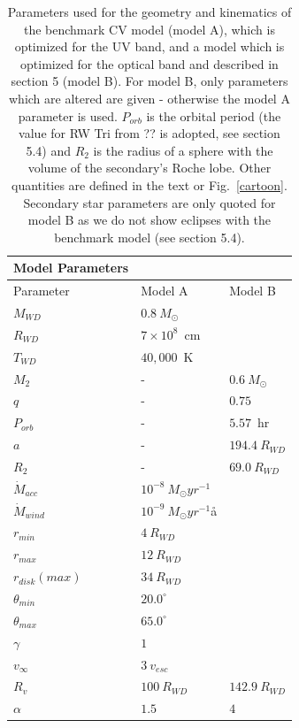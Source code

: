 \documentclass[preprint, a4paper, 11pt]{aastex}
\begin{document}
\begin{table}
\centering
\begin{tabular}{p{2cm}p{2cm}p{2cm}}
Model Parameters \\
\hline Parameter 	&	 Model A  & Model B \\ 
\hline \hline 
$M_{WD}$ 	 &	 $0.8~M_{\odot}$  &     \\ 
$R_{WD}$ 	 &	 $7\times10^{8}$~cm  & \\ 
$T_{WD}$ 	 &	 $40,000$~K        &  \\
$M_{2}$ 	& -&	 $0.6~M_{\odot}$   \\ 
$q$ 	&- &	 $0.75$   \\ 
$P_{orb}$ 	&- &	 $5.57$~hr   \\ 
$a$ 	& -&	 $194.4~R_{WD}$   \\ 
$R_2$   &   -  &	 $69.0~R_{WD}$  \\ 
$\dot{M}_{acc}$ 	 &	 $10^{-8}~M_{\odot}yr^{-1}$  &\\ 
$\dot{M}_{wind}$  &	$10^{-9}~M_{\odot}yr^{-1}$å  & \\ 
$r_{min}$ 	&	 $4~R_{WD}$ &  \\ 
$r_{max}$ 	&	 $12~R_{WD}$  &  \\ 
$r_{disk} (max)$ 	&	 $34~R_{WD}$  &  \\ 
$\theta_{min}$ 	&	 $20.0^{\circ}$  &  \\ 
$\theta_{max}$ 	&	 $65.0^{\circ}$  &  \\ 
$\gamma$ 	&	 $1$  &  \\ 
$v_{\infty}$ 	&	 $3~v_{esc}$  &  \\ 
$R_v$ 	        &	 $100~R_{WD}$  &  $142.9~R_{WD}$  \\ 
$\alpha$ 	&	 $1.5$   &   $4$\\
\end{tabular}
\centering
\caption{
Parameters used for the geometry and kinematics of the benchmark 
CV model (model A), which is optimized for the UV band, and a model
which is optimized for the optical band and described in section 5 (model B).
For model B, only parameters which are altered are given - otherwise the
model A parameter is used. $P_{orb}$ is the orbital period 
(the value for RW Tri from ?? is adopted, see section 5.4) and 
$R_2$ is the radius of a sphere with the volume of the secondary's Roche lobe. 
Other quantities are defined in the text or Fig.~\ref{cartoon}.
Secondary star parameters are only quoted for 
model B as we do not show eclipses with the 
benchmark model (see section 5.4).
}
\label{wind_param}
\label{modelb_table}
\end{table}
\end{document}
